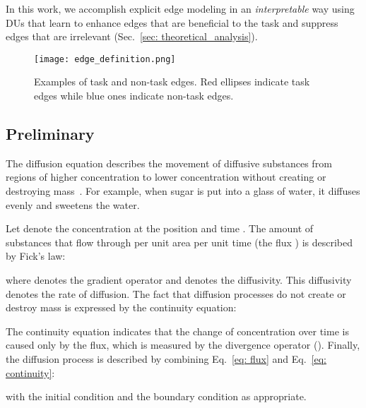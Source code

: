 \documentclass[a4paper,fleqn]{cas-dc}
\begin{document}
In this work, we accomplish explicit edge modeling in an \textit{interpretable} way using DUs that learn to enhance edges that are beneficial to the task and suppress edges that are irrelevant (Sec.~\ref{sec: theoretical_analysis}).
\begin{figure}[t]
    \centering
    \texttt{[image: edge\_definition.png]}
    \caption{Examples of task and non-task edges. Red ellipses indicate task edges while blue ones indicate non-task edges.}
    \label{fig: edge_def}
\end{figure}

\subsection{Preliminary}
The diffusion equation describes the movement of diffusive substances from regions of higher concentration to lower concentration without creating or destroying mass~\cite{weickert1998anisotropic}. 
For example, when sugar is put into a glass of water, it diffuses evenly and sweetens the water.

Let  denote the concentration at the position  and time . 
The amount of substances that flow through per unit area per unit time (the flux ) is described by Fick's law:

where  denotes the gradient operator and  denotes the diffusivity. This diffusivity denotes the rate of diffusion. The fact that diffusion processes do not create or destroy mass is expressed by the continuity equation:

The continuity equation indicates that the change of concentration over time is caused only by the flux, which is measured by the divergence operator (). Finally, the diffusion process is described by combining Eq.~\eqref{eq: flux} and Eq.~\eqref{eq: continuity}: 

with the initial condition  and the boundary condition as appropriate.  
\end{document}
